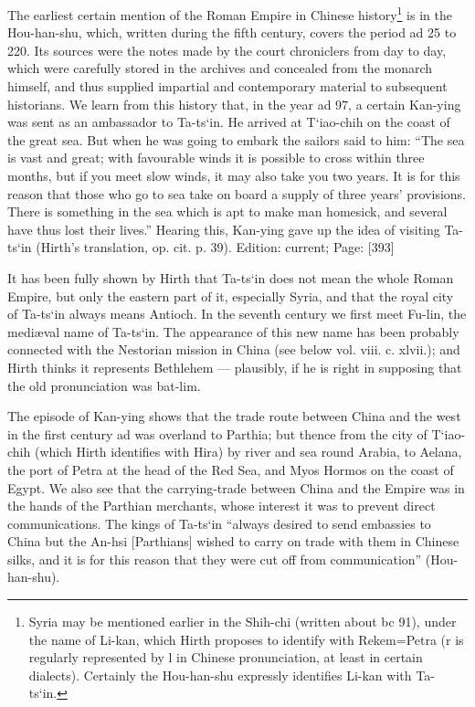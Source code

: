 The earliest certain mention of the Roman Empire in Chinese history\footnote{Syria may be mentioned earlier in the Shih-chi (written about bc 91), under the name of Li-kan, which Hirth proposes to identify with Rekem=Petra (r is regularly represented by l in Chinese pronunciation, at least in certain dialects). Certainly the Hou-han-shu expressly identifies Li-kan with Ta-ts\texthebrew{‘}in.} is in the Hou-han-shu, which, written during the fifth century, covers the period ad 25 to 220. Its sources were the notes made by the court chroniclers from day to day, which were carefully stored in the archives and concealed from the monarch himself, and thus supplied impartial and contemporary material to subsequent historians. We learn from this history that, in the year ad 97, a certain Kan-ying was sent as an ambassador to Ta-ts\texthebrew{‘}in. He arrived at T\texthebrew{‘}iao-chih on the coast of the great sea. But when he was going to embark the sailors said to him: \texthebrew{“}The sea is vast and great; with favourable winds it is possible to cross within three months, but if you meet slow winds, it may also take you two years. It is for this reason that those who go to sea take on board a supply of three years\texthebrew{}’ provisions. There is something in the sea which is apt to make man homesick, and several have thus lost their lives.\texthebrew{}” Hearing this, Kan-ying gave up the idea of visiting Ta-ts\texthebrew{‘}in (Hirth\texthebrew{}’s translation, op. cit. p. 39).
Edition: current; Page: [393]

It has been fully shown by Hirth that Ta-ts\texthebrew{‘}in does not mean the whole Roman Empire, but only the eastern part of it, especially Syria, and that the royal city of Ta-ts\texthebrew{‘}in always means Antioch. In the seventh century we first meet Fu-lin, the mediæval name of Ta-ts\texthebrew{‘}in. The appearance of this new name has been probably connected with the Nestorian mission in China (see below vol. viii. c. xlvii.); and Hirth thinks it represents Bethlehem \texthebrew{—} plausibly, if he is right in supposing that the old pronunciation was bat-lim.

The episode of Kan-ying shows that the trade route between China and the west in the first century ad was overland to Parthia; but thence from the city of T\texthebrew{‘}iao-chih (which Hirth identifies with Hira) by river and sea round Arabia, to Aelana, the port of Petra at the head of the Red Sea, and Myos Hormos on the coast of Egypt. We also see that the carrying-trade between China and the Empire was in the hands of the Parthian merchants, whose interest it was to prevent direct communications. The kings of Ta-ts\texthebrew{‘}in \texthebrew{“}always desired to send embassies to China but the An-hsi [Parthians] wished to carry on trade with them in Chinese silks, and it is for this reason that they were cut off from communication\texthebrew{}” (Hou-han-shu).

